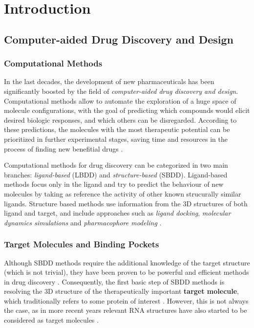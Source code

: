 \chapter{Introduction} %

\section{Computer-aided Drug Discovery and Design}
  \subsection{Computational Methods}
    In the last decades, the development of new pharmaceuticals has been significantly boosted by the field of \textit{computer-aided drug discovery and design}. Computational methods allow to automate the exploration of a huge space of molecule configurations, with the goal of predicting which compounds would elicit desired biologic responses, and which others can be disregarded. According to these predictions, the molecules with the most therapeutic potential can be prioritized in further experimental stages, saving time and resources in the process of finding new benefitial drugs \cite{drug_discovery_2014}.

    Computational methods for drug discovery can be categorized in two main branches: \textit{ligand-based} (LBDD) and \textit{structure-based} (SBDD). Ligand-based methods focus only in the ligand and try to predict the behaviour of new molecules by taking as reference the activity of other known strucurally similar ligands. Structure based methods use information from the 3D structures of both ligand and target, and include approaches such as \textit{ligand docking}, \textit{molecular dynamics simulations} and \textit{pharmacophore modeling} \cite{drug_discovery_2014, structure_based_2019}.

  \subsection{Target Molecules and Binding Pockets}
    Although SBDD methods require the additional knowledge of the target structure (which is not trivial), they have been proven to be powerful and efficient methods in drug discovery \cite{structure_based_2019}. Consequently, the first basic step of SBDD methods is resolving the 3D structure of the therapeutically important \textbf{target molecule}, which traditionally refers to some protein of interest \cite{structure_based_2019}. However, this is not always the case, as in more recent years relevant RNA structures have also started to be considered as target molecules \cite{rna_targets_2022}.

